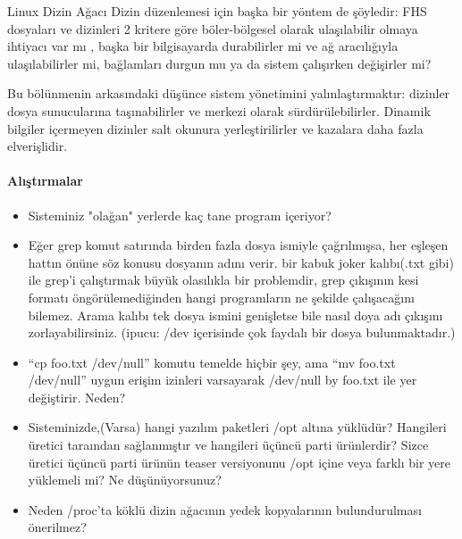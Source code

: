 \begin{section}{Linux Dizin Ağacı}
Dizin düzenlemesi için başka bir yöntem de şöyledir: FHS dosyaları ve dizinleri 2 kritere göre böler-bölgesel olarak ulaşılabilir olmaya ihtiyacı var mı , başka bir bilgisayarda durabilirler mi ve ağ aracılığıyla ulaşılabilirler mi, bağlamları durgun mu ya da sistem çalışırken değişirler mi?

Bu bölünmenin arkasındaki düşünce sistem yönetimini yalınlaştırmaktır: dizinler dosya sunucularına taşınabilirler ve merkezi olarak sürdürülebilirler. Dinamik bilgiler içermeyen dizinler salt okunura yerleştirilirler ve kazalara daha fazla elverişlidir.

\paragraph{Alıştırmalar}{
\begin{itemize}
\item Sisteminiz "olağan" yerlerde kaç tane program içeriyor?
\item Eğer grep komut satırında birden fazla dosya ismiyle çağrılmışsa, her eşleşen hattın önüne söz konusu dosyanın adını verir. bir kabuk joker kalıbı(.txt gibi) ile grep'i çalıştırmak büyük olasılıkla bir problemdir, grep çıkışının kesi formatı öngörülemediğinden hangi programların ne şekilde çalışacağını bilemez. Arama kalıbı tek dosya ismini genişletse bile nasıl doya adı çıkışını zorlayabilirsiniz. (ipucu: /dev içerisinde çok faydalı bir dosya bulunmaktadır.)
\item “cp foo.txt /dev/null” komutu temelde hiçbir şey, ama “mv foo.txt /dev/null” uygun erişim izinleri varsayarak /dev/null by foo.txt ile yer değiştirir. Neden?
\item Sisteminizde,(Varsa) hangi yazılım paketleri /opt altına yüklüdür? Hangileri üretici taraından sağlanmıştır ve hangileri üçüncü parti ürünlerdir? Sizce üretici üçüncü parti ürünün teaser versiyonunu /opt içine veya farklı bir yere  yüklemeli mi? Ne düşünüyorsunuz?
\item Neden /proc'ta köklü dizin ağacının yedek kopyalarının bulundurulması önerilmez?
\end{itemize}
}
\end{section}
